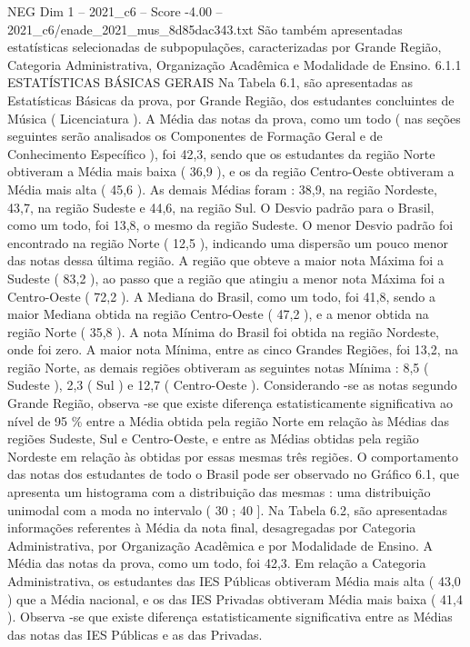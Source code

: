 \begin{textsample}{NEG Dim 1 – 2021\_c6 – Score -4.00 – 2021\_c6/enade\_2021\_mus\_8d85dac343.txt}
São também apresentadas estatísticas selecionadas de subpopulações, caracterizadas por Grande Região, Categoria Administrativa, Organização Acadêmica e Modalidade de Ensino. 6.1.1 ESTATÍSTICAS BÁSICAS GERAIS Na Tabela 6.1, são apresentadas as Estatísticas Básicas da prova, por Grande Região, dos estudantes concluintes de Música ( Licenciatura ).
A Média das notas da prova, como um todo ( nas seções seguintes serão analisados os Componentes de Formação Geral e de Conhecimento Específico ), foi 42,3, sendo que os estudantes da região Norte obtiveram a Média mais baixa ( 36,9 ), e os da região Centro-Oeste obtiveram a Média mais alta ( 45,6 ).
As demais Médias foram : 38,9, na região Nordeste, 43,7, na região Sudeste e 44,6, na região Sul.
O Desvio padrão para o Brasil, como um todo, foi 13,8, o mesmo da região Sudeste.
O menor Desvio padrão foi encontrado na região Norte ( 12,5 ), indicando uma dispersão um pouco menor das notas dessa última região.
A região que obteve a maior nota Máxima foi a Sudeste ( 83,2 ), ao passo que a região que atingiu a menor nota Máxima foi a Centro-Oeste ( 72,2 ).
A Mediana do Brasil, como um todo, foi 41,8, sendo a maior Mediana obtida na região Centro-Oeste ( 47,2 ), e a menor obtida na região Norte ( 35,8 ).
A nota Mínima do Brasil foi obtida na região Nordeste, onde foi zero.
A maior nota Mínima, entre as cinco Grandes Regiões, foi 13,2, na região Norte, as demais regiões obtiveram as seguintes notas Mínima : 8,5 ( Sudeste ), 2,3 ( Sul ) e 12,7 ( Centro-Oeste ).
Considerando -se as notas segundo Grande Região, observa -se que existe diferença estatisticamente significativa ao nível de 95 \% entre a Média obtida pela região Norte em relação às Médias das regiões Sudeste, Sul e Centro-Oeste, e entre as Médias obtidas pela região Nordeste em relação às obtidas por essas mesmas três regiões.
O comportamento das notas dos estudantes de todo o Brasil pode ser observado no Gráfico 6.1, que apresenta um histograma com a distribuição das mesmas : uma distribuição unimodal com a moda no intervalo ( 30 ; 40 ].
Na Tabela 6.2, são apresentadas informações referentes à Média da nota final, desagregadas por Categoria Administrativa, por Organização Acadêmica e por Modalidade de Ensino.
A Média das notas da prova, como um todo, foi 42,3.
Em relação a Categoria Administrativa, os estudantes das IES Públicas obtiveram Média mais alta ( 43,0 ) que a Média nacional, e os das IES Privadas obtiveram Média mais baixa ( 41,4 ).
Observa -se que existe diferença estatisticamente significativa entre as Médias das notas das IES Públicas e as das Privadas.

\end{textsample}

